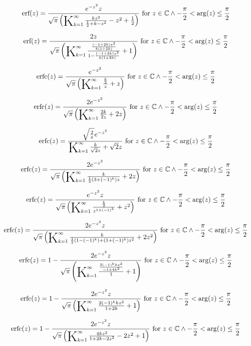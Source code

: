 \documentclass{article}
\newcommand{\bigK}{\mathop{\raisebox{-5pt}{\huge K}}}
\begin{document}
\[\text{erf}(z)=\frac{e^{-z^2} z}{\sqrt{\pi } \left(\bigK_{k=1}^{\infty}\frac{k z^2}{\frac{1}{2}+k-z^2}-z^2+\frac{1}{2}\right)}\text{ for }z\in \mathbb{C}\land -\frac{\pi }{2}<\arg (z)\leq \frac{\pi }{2}\] 

\[\text{erf}(z)=\frac{2 z}{\sqrt{\pi } \left(\bigK_{k=1}^{\infty}\frac{\frac{(-1+2 k) z^2}{k (1+2 k)}}{1-\frac{(-1+2 k) z^2}{k (1+2 k)}}+1\right)}\text{ for }z\in \mathbb{C}\land -\frac{\pi }{2}<\arg (z)\leq \frac{\pi }{2}\] 

\[\text{erfc}(z)=\frac{e^{-z^2}}{\sqrt{\pi } \left(\bigK_{k=1}^{\infty}\frac{\frac{k}{2}}{z}+z\right)}\text{ for }z\in \mathbb{C}\land -\frac{\pi }{2}<\arg (z)\leq \frac{\pi }{2}\] 

\[\text{erfc}(z)=\frac{2 e^{-z^2}}{\sqrt{\pi } \left(\bigK_{k=1}^{\infty}\frac{2 k}{2 z}+2 z\right)}\text{ for }z\in \mathbb{C}\land -\frac{\pi }{2}<\arg (z)\leq \frac{\pi }{2}\] 

\[\text{erfc}(z)=\frac{\sqrt{\frac{2}{\pi }} e^{-z^2}}{\bigK_{k=1}^{\infty}\frac{k}{\sqrt{2} z}+\sqrt{2} z}\text{ for }z\in \mathbb{C}\land -\frac{\pi }{2}<\arg (z)\leq \frac{\pi }{2}\] 

\[\text{erfc}(z)=\frac{2 e^{-z^2}}{\sqrt{\pi } \left(\bigK_{k=1}^{\infty}\frac{k}{\frac{1}{2} \left(3+(-1)^k\right) z}+2 z\right)}\text{ for }z\in \mathbb{C}\land -\frac{\pi }{2}<\arg (z)\leq \frac{\pi }{2}\] 

\[\text{erfc}(z)=\frac{e^{-z^2} z}{\sqrt{\pi } \left(\bigK_{k=1}^{\infty}\frac{\frac{k}{2}}{z^{1+(-1)^k}}+z^2\right)}\text{ for }z\in \mathbb{C}\land -\frac{\pi }{2}<\arg (z)\leq \frac{\pi }{2}\] 

\[\text{erfc}(z)=\frac{2 e^{-z^2} z}{\sqrt{\pi } \left(\bigK_{k=1}^{\infty}\frac{k}{\frac{1}{2} \left(1-(-1)^k\right)+\left(1+(-1)^k\right) z^2}+2 z^2\right)}\text{ for }z\in \mathbb{C}\land -\frac{\pi }{2}<\arg (z)\leq \frac{\pi }{2}\] 

\[\text{erfc}(z)=1-\frac{2 e^{-z^2} z}{\sqrt{\pi } \left(\bigK_{k=1}^{\infty}\frac{\frac{2 (-1)^k k z^2}{-1+4 k^2}}{1}+1\right)}\text{ for }z\in \mathbb{C}\land -\frac{\pi }{2}<\arg (z)\leq \frac{\pi }{2}\] 

\[\text{erfc}(z)=1-\frac{2 e^{-z^2} z}{\sqrt{\pi } \left(\bigK_{k=1}^{\infty}\frac{2 (-1)^k k z^2}{1+2 k}+1\right)}\text{ for }z\in \mathbb{C}\land -\frac{\pi }{2}<\arg (z)\leq \frac{\pi }{2}\] 

\[\text{erfc}(z)=1-\frac{2 e^{-z^2} z}{\sqrt{\pi } \left(\bigK_{k=1}^{\infty}\frac{4 k z^2}{1+2 k-2 z^2}-2 z^2+1\right)}\text{ for }z\in \mathbb{C}\land -\frac{\pi }{2}<\arg (z)\leq \frac{\pi }{2}\] 
\end{document}
